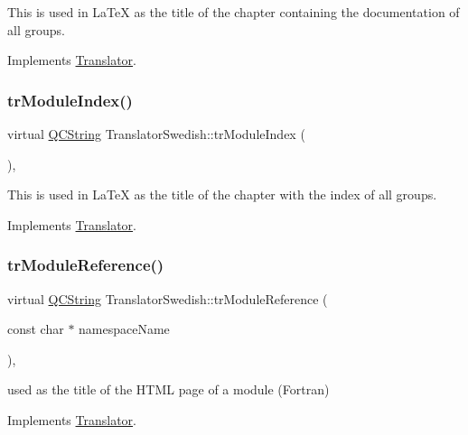 This is used in La\+TeX as the title of the chapter containing the documentation of all groups. 

Implements \mbox{\hyperlink{class_translator}{Translator}}.

\mbox{\label{class_translator_swedish_af519cda4f5f257d17c7456b0bd660db1}} 
\subsubsection{\texorpdfstring{trModuleIndex()}{trModuleIndex()}}
{\footnotesize\ttfamily virtual \mbox{\hyperlink{class_q_c_string}{Q\+C\+String}} Translator\+Swedish\+::tr\+Module\+Index (\begin{DoxyParamCaption}{ }\end{DoxyParamCaption})\hspace{0.3cm}{\ttfamily [inline]}, {\ttfamily [virtual]}}

This is used in La\+TeX as the title of the chapter with the index of all groups. 

Implements \mbox{\hyperlink{class_translator}{Translator}}.

\mbox{\label{class_translator_swedish_a1fc7559a678495bfc69c61f1814e9654}} 
\subsubsection{\texorpdfstring{trModuleReference()}{trModuleReference()}}
{\footnotesize\ttfamily virtual \mbox{\hyperlink{class_q_c_string}{Q\+C\+String}} Translator\+Swedish\+::tr\+Module\+Reference (\begin{DoxyParamCaption}\item[{const char $\ast$}]{namespace\+Name }\end{DoxyParamCaption})\hspace{0.3cm}{\ttfamily [inline]}, {\ttfamily [virtual]}}

used as the title of the H\+T\+ML page of a module (Fortran) 

Implements \mbox{\hyperlink{class_translator}{Translator}}.

